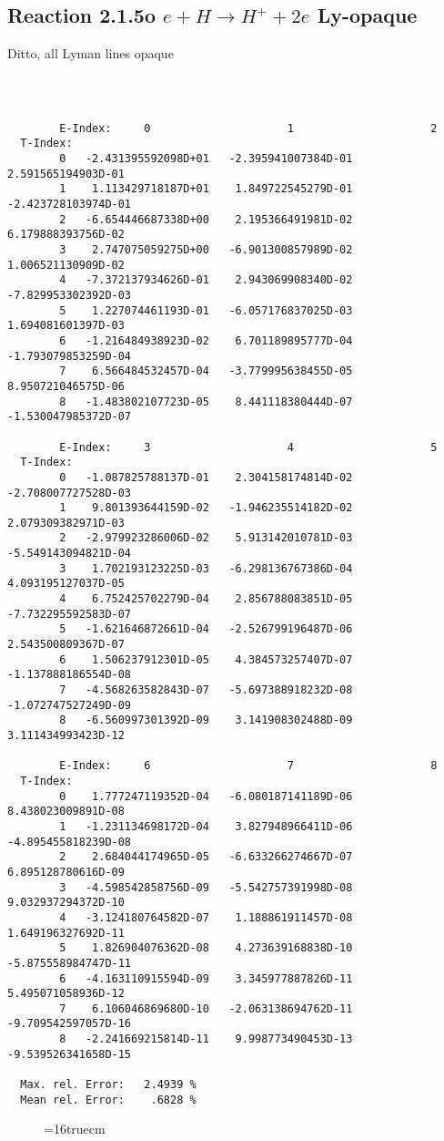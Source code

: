 \documentclass[12pt]{article}
\begin{document}
\subsection{
Reaction 2.1.5o $ e + H \rightarrow H^+ + 2e $  Ly-opaque}


Ditto, all Lyman lines opaque


\begin{small}\begin{verbatim}



        E-Index:     0                     1                     2
  T-Index:
        0   -2.431395592098D+01   -2.395941007384D-01    2.591565194903D-01
        1    1.113429718187D+01    1.849722545279D-01   -2.423728103974D-01
        2   -6.654446687338D+00    2.195366491981D-02    6.179888393756D-02
        3    2.747075059275D+00   -6.901300857989D-02    1.006521130909D-02
        4   -7.372137934626D-01    2.943069908340D-02   -7.829953302392D-03
        5    1.227074461193D-01   -6.057176837025D-03    1.694081601397D-03
        6   -1.216484938923D-02    6.701189895777D-04   -1.793079853259D-04
        7    6.566484532457D-04   -3.779995638455D-05    8.950721046575D-06
        8   -1.483802107723D-05    8.441118380444D-07   -1.530047985372D-07

        E-Index:     3                     4                     5
  T-Index:
        0   -1.087825788137D-01    2.304158174814D-02   -2.708007727528D-03
        1    9.801393644159D-02   -1.946235514182D-02    2.079309382971D-03
        2   -2.979923286006D-02    5.913142010781D-03   -5.549143094821D-04
        3    1.702193123225D-03   -6.298136767386D-04    4.093195127037D-05
        4    6.752425702279D-04    2.856788083851D-05   -7.732295592583D-07
        5   -1.621646872661D-04   -2.526799196487D-06    2.543500809367D-07
        6    1.506237912301D-05    4.384573257407D-07   -1.137888186554D-08
        7   -4.568263582843D-07   -5.697388918232D-08   -1.072747527249D-09
        8   -6.560997301392D-09    3.141908302488D-09    3.111434993423D-12

        E-Index:     6                     7                     8
  T-Index:
        0    1.777247119352D-04   -6.080187141189D-06    8.438023009891D-08
        1   -1.231134698172D-04    3.827948966411D-06   -4.895455818239D-08
        2    2.684044174965D-05   -6.633266274667D-07    6.895128780616D-09
        3   -4.598542858756D-09   -5.542757391998D-08    9.032937294372D-10
        4   -3.124180764582D-07    1.188861911457D-08    1.649196327692D-11
        5    1.826904076362D-08    4.273639168838D-10   -5.875558984747D-11
        6   -4.163110915594D-09    3.345977887826D-11    5.495071058936D-12
        7    6.106046869680D-10   -2.063138694762D-11   -9.709542597057D-16
        8   -2.241669215814D-11    9.998773490453D-13   -9.539526341658D-15

  Max. rel. Error:   2.4939 %
  Mean rel. Error:    .6828 %

\end{verbatim}\end{small}
\begin{figure} \label{2.1.5io}
\epsfxsize=16truecm
\end{figure}
\newpage
\end{document}
